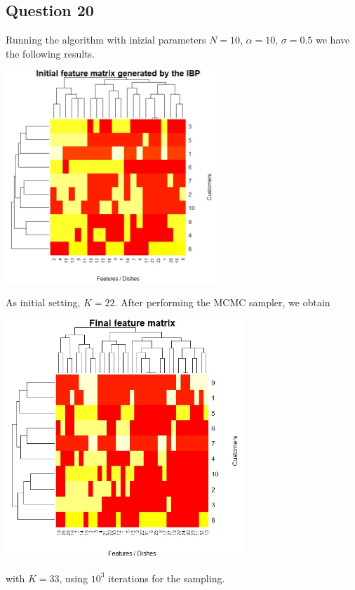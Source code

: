 \documentclass[]{article}
\begin{document}
\subsection*{Question 20}
Running the algorithm with inizial parameters $N = 10$, $\alpha = 10$, $\sigma=0.5$ we have the following results.
\\
\begin{center}
	\includegraphics[width=8cm]{task7/output_initial_alpha10_sigma05.jpeg}
\end{center}
As initial setting, $K=22$. After performing the MCMC sampler, we obtain
\\
\begin{center}
	\includegraphics[width=9cm]{task7/output_final_alpha10_sigma05.jpeg}
\end{center}
with $K=33$, using $10^3$ iterations for the sampling. 
\end{document}

